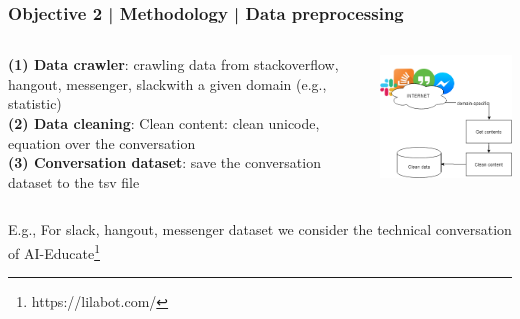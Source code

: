 \documentclass{beamer}
\begin{document}
\begin{frame}
\frametitle{Objective 2 | Methodology | Data preprocessing}



\begin{columns}
	
	\begin{column}{.55\textwidth}
\textbf{	(1) Data crawler}: crawling data from stackoverflow,\\ hangout, messenger, slackwith a given domain (e.g., statistic)\\
\textbf{	(2) Data cleaning}: Clean content: clean unicode, equation over the conversation\\
\textbf{	(3) Conversation dataset}: save the conversation dataset to the tsv file\\
	\end{column}
	\begin{column}{.55\textwidth}
		\includegraphics[width=50mm]{dts.png}
	\end{column}
	

\end{columns}
\begin{flushleft}
{\small 	E.g., For slack, hangout, messenger dataset we consider the technical conversation of AI-Educate}\footnote{https://lilabot.com/}
\end{flushleft}

\end{frame}
\end{document}
